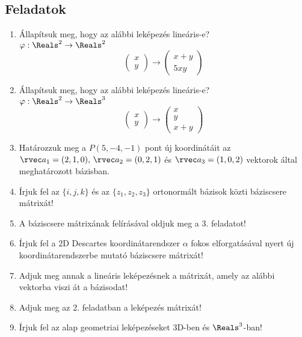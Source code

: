 \documentclass[a4paper, 12pt]{scrartcl}
\begin{document}
\subsection{Feladatok}
\begin{enumerate}
  \item Állapítsuk meg, hogy az alábbi leképezés lineáris-e?\\
        $\varphi: \Reals^2 \to \Reals^2$
        $$
          \begin{pmatrix}
            x \\
            y
          \end{pmatrix} \longrightarrow \begin{pmatrix}
            x+y \\
            5xy
          \end{pmatrix}
        $$
  \item Állapítsuk meg, hogy az alábbi leképezés lineáris-e?\\
        $\varphi: \Reals^2 \to \Reals^3$
        $$
          \begin{pmatrix}
            x \\
            y
          \end{pmatrix} \longrightarrow \begin{pmatrix}
            x \\
            y \\
            x+y
          \end{pmatrix}
        $$
  \item Határozzuk meg a $P(5,-4,-1)$ pont új koordinátáit az $\rvec a_1=(2, 1,0),\, \rvec a_2=(0,2,1)$ és $\rvec a_3=(1,0,2)$ vektorok által meghatározott bázisban.
  \item Írjuk fel az $\{i, j, k \}$ és az $\{z_1, z_2, z_3\}$ ortonormált bázisok közti báziscsere mátrixát!
  \item A báziscsere mátrixának felírásával oldjuk meg a 3. feladatot!
  \item Írjuk fel a 2D Descartes koordinátarendszer $\alpha$ fokos elforgatásával nyert új koordinátarendszerbe mutató báziscsere mátrixát!
  \item Adjuk meg annak a lineáris leképezésnek a mátrixát, amely az alábbi vektorba viszi át a bázisodat!
  \item Adjuk meg az 2. feladatban a leképezés mátrixát!
  \item Írjuk fel az alap geometriai leképezéseket 3D-ben és $\Reals^3$-ban!
        \begin{multicols}{2}

\end{multicols}
\end{enumerate}
\end{document}
